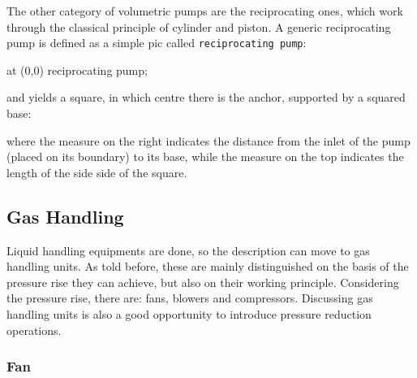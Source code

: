 \documentclass[12pt]{article}						%
\newcommand*{\chpn}[1]{\texttt{#1}}				%
\newcommand*{\chpp}[1]{\texttt{#1}}				%
\begin{document}
The other category of volumetric pumps are the reciprocating ones, which work
through the classical principle of cylinder and piston. A generic reciprocating
pump is defined as a simple pic called \chpp{reciprocating pump}:
\begin{chpcode}
	\pic at (0,0) {reciprocating pump};
\end{chpcode}
and yields a square, in which centre there is the anchor, supported by a
squared base:
\begin{center}
\end{center}
where the measure on the right indicates the distance from the inlet of the pump
(placed on its boundary) to its base, while the measure on the top indicates the
length of the side side of the square.

\subsection{Gas Handling}
\label{subsec:gashan}

Liquid handling equipments are done, so the description can move to gas handling
units. As told before, these are mainly distinguished on the basis of the
pressure rise they can achieve, but also on their working principle. Considering
the pressure rise, there are: fans, blowers and compressors. Discussing gas
handling units is also a good opportunity to introduce pressure reduction
operations.

\subsubsection{Fan}
\end{document}

